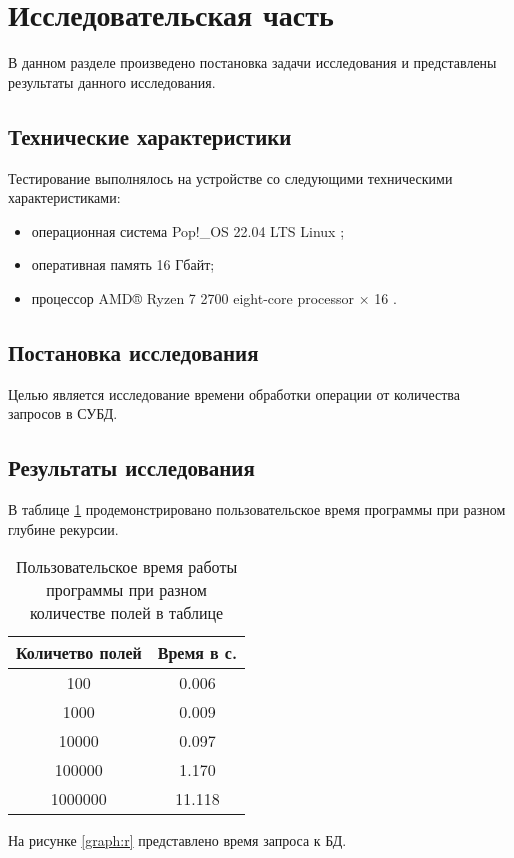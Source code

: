 \section{Исследовательская часть}

В данном разделе произведено постановка задачи исследования и представлены
результаты данного исследования.

\subsection{Технические характеристики}
Тестирование выполнялось на устройстве со следующими техническими
характеристиками:
\begin{itemize}
	\item операционная система Pop!\_OS 22.04 LTS \cite{popos} Linux
	      \cite{Linux};
	\item оперативная память 16 Гбайт;
	\item процессор AMD® Ryzen 7 2700 eight-core processor × 16 \cite{amd}.
\end{itemize}

\subsection{Постановка исследования}

Целью является исследование времени обработки операции от количества запросов в
СУБД.

\subsection{Результаты исследования}

В таблице \ref{tab:time1} продемонстрировано пользовательское время программы
при разном глубине рекурсии.

\begin{table}[ht!]
	\begin{center}

		\caption{Пользовательское время работы программы при разном
			количестве
			полей в таблице}
		\label{tab:time1}
		\begin{tabular}{|c|c|}
			\hline
			Количетво полей & Время в с. \\
			\hline
			100             & 0.006      \\
			\hline
			1000            & 0.009      \\
			\hline
			10000           & 0.097      \\
			\hline
			100000          & 1.170      \\
			\hline
			1000000         & 11.118     \\
			\hline

		\end{tabular}
	\end{center}
\end{table}
\newpage
На рисунке \ref{graph:r} представлено время запроса к БД.

